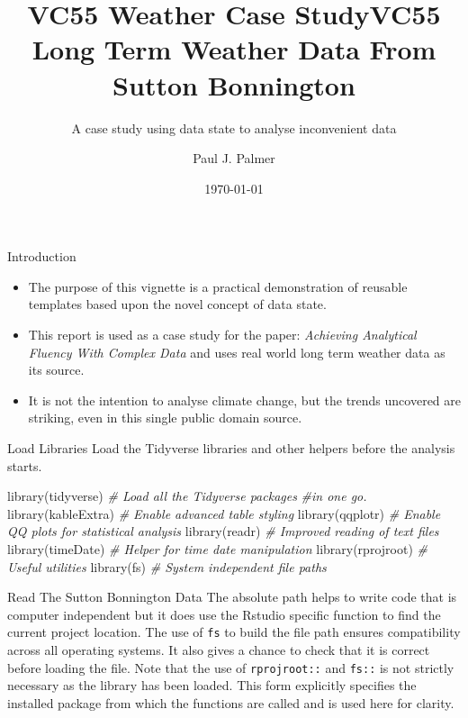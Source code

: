 \documentclass[
  ignorenonframetext,
]{beamer}
\title{VC55 Weather Case Study}
\author{Paul J. Palmer}
\date{}
\title[ VC55 Weather Case Study]{VC55 Long Term Weather Data From Sutton Bonnington} %
\subtitle{A case study using data state to analyse inconvenient data}
\institute[LU] %
{
    Visiting Fellow \\
    Loughborough University \\
    \copyright~P.J.~Palmer~2022
    
    
    
}
\date{\today} %
\newenvironment{Shaded}{\begin{snugshade}}{\end{snugshade}}
\newcommand{\CommentTok}[1]{\textcolor[rgb]{0.56,0.35,0.01}{\textit{#1}}}
\newcommand{\FunctionTok}[1]{\textcolor[rgb]{0.00,0.00,0.00}{#1}}
\newcommand{\NormalTok}[1]{#1}
\providecommand{\tightlist}{%
  \setlength{\itemsep}{0pt}\setlength{\parskip}{0pt}}
\begin{document}
\frame{\titlepage}

\begin{frame}{Introduction}
\protect\hypertarget{introduction}{}
\begin{itemize}
\tightlist
\item
  The purpose of this vignette is a practical demonstration of reusable
  templates based upon the novel concept of data state.
\item
  This report is used as a case study for the paper: \emph{Achieving
  Analytical Fluency With Complex Data} and uses real world long term
  weather data as its source.
\item
  It is not the intention to analyse climate change, but the trends
  uncovered are striking, even in this single public domain source.
\end{itemize}
\end{frame}

\begin{frame}[fragile]{Load Libraries}
\protect\hypertarget{load-libraries}{}
Load the Tidyverse libraries and other helpers before the analysis
starts.

\begin{Shaded}
\begin{Highlighting}[]
\FunctionTok{library}\NormalTok{(tidyverse) }\CommentTok{\# Load all the Tidyverse packages }
\CommentTok{\#in one go.}
\FunctionTok{library}\NormalTok{(kableExtra) }\CommentTok{\# Enable advanced table styling}
\FunctionTok{library}\NormalTok{(qqplotr) }\CommentTok{\# Enable QQ plots for statistical analysis}
\FunctionTok{library}\NormalTok{(readr) }\CommentTok{\# Improved reading of text files}
\FunctionTok{library}\NormalTok{(timeDate) }\CommentTok{\# Helper for time date manipulation}
\FunctionTok{library}\NormalTok{(rprojroot) }\CommentTok{\# Useful utilities}
\FunctionTok{library}\NormalTok{(fs) }\CommentTok{\# System independent file paths}
\end{Highlighting}
\end{Shaded}
\end{frame}

\begin{frame}[fragile]{Read The Sutton Bonnington Data}
\protect\hypertarget{read-the-sutton-bonnington-data}{}
The absolute path helps to write code that is computer independent but
it does use the Rstudio specific function to find the current project
location. The use of \texttt{fs} to build the file path ensures
compatibility across all operating systems. It also gives a chance to
check that it is correct before loading the file. Note that the use of
\texttt{rprojroot::} and \texttt{fs::} is not strictly necessary as the
library has been loaded. This form explicitly specifies the installed
package from which the functions are called and is used here for
clarity.
\end{frame}
\end{document}
